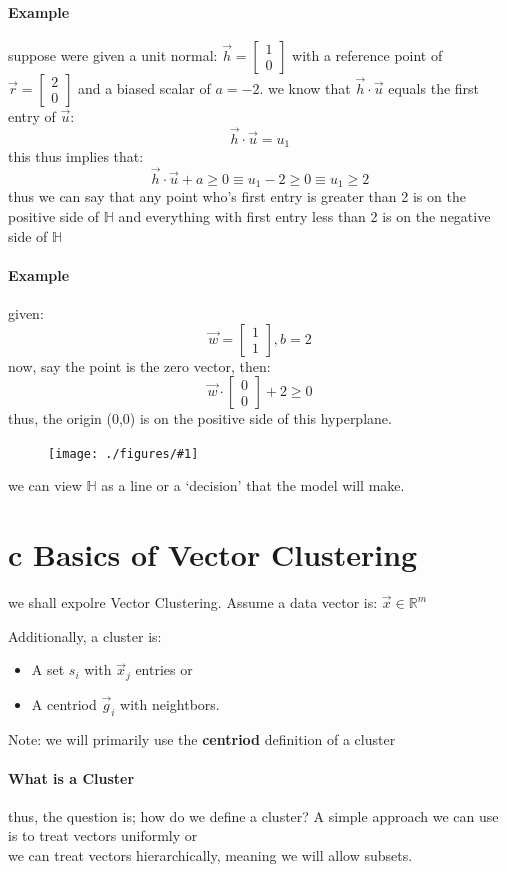 \documentclass[12pt]{book}
\newcommand{\incimg}[2]{%
       \begin{figure}[h]
               \centering
               \texttt{[image: ./figures/\#1]}
       \end{figure}
}
\begin{document}
\paragraph{Example}
suppose were given a unit normal: 
$\vec h = \begin{bmatrix} 1\\0 \end{bmatrix}$ with a reference point of 
$\vec r = \begin{bmatrix} 2\\0 \end{bmatrix}$ 
and a biased scalar of $a = -2$.
we know that $\vec h \cdot \vec u$ equals the first entry of $\vec u$:
\[\vec h \cdot \vec u = u_1\]
this thus implies that:
\[\vec h \cdot \vec u + a \geq 0 \equiv u_1-2 \geq 0 \equiv u_1 \geq 2\]
thus we can say that any point who's first entry is greater than 2 is on 
the positive side of $\mathbb{H}$ and everything with first entry less
than 2 is on the negative side of $\mathbb{H}$

\paragraph{Example}
given:
\[\vec w = \begin{bmatrix}1\\1\end{bmatrix}, b = 2\]
now, say the point is the zero vector, then:
\[\vec w \cdot \begin{bmatrix} 0\\0\end{bmatrix} + 2 \geq 0\]
thus, the origin (0,0) is on the positive side of this hyperplane.
\incimg{decision}{0.5}
we can view $\mathbb{H}$ as a line or a `decision' that the model will
make.
\pagebreak

\section*{c Basics of Vector Clustering}
we shall expolre Vector Clustering. Assume a data vector is: $\vec x \in 
\mathbb{R}^m$

Additionally, a cluster is:
\begin{itemize}
        \item A set $s_i$ with $\vec x_j$ entries or
        \item A centriod $\vec g_i$ with neightbors.
\end{itemize}
Note: we will primarily use the \textbf{centriod} definition 
of a cluster
\paragraph{What is a Cluster}
thus, the question is; how do we define a cluster?
A simple approach we can use is to treat vectors uniformly or\\
we can treat vectors hierarchically, meaning we will allow 
subsets.
\end{document}
